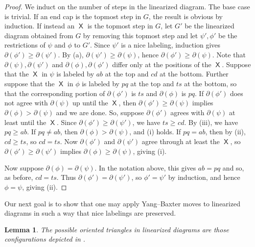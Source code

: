 \documentclass{amsart}
\newtheorem{lemma}[theorem]{Lemma}
\theoremstyle{definition}
\theoremstyle{remark}
\numberwithin{equation}{section}
\DeclareMathOperator{\tlex}{l\widetilde{ex}}
\DeclareMathOperator{\sfX}{\mathsf{X}}
\begin{document}
\begin{proof}
  We induct on the number of steps in the linearized diagram. The base case is trivial. If an end cap is the topmost step in $G$, the result is obvious by induction. If instead an $\sfX$ is the topmost step in $G$, let $G'$ be the linearized diagram obtained from $G$ by removing this topmost step and let $\psi', \phi'$ be the restrictions of $\psi$ and $\phi$ to $G'$. Since $\psi'$ is a nice labeling, induction gives $\partial(\phi') \geq_{\tlex} \partial(\psi')$. By (a), $\partial(\psi') \geq_{\tlex} \partial(\psi)$, hence $\partial(\phi') \geq_{\tlex} \partial(\psi)$. Note that $\partial(\psi), \partial(\psi')$ and $\partial(\phi), \partial(\phi')$ differ only at the positions of the $\sfX$. Suppose that the $\sfX$ in $\psi$ is labeled by $ab$ at the top and $cd$ at the bottom. Further suppose that the $\sfX$ in $\phi$ is labeled by $pq$ at the top and $ts$ at the bottom, so that the corresponding portion of $\partial(\phi')$ is $ts$ and $\partial(\phi)$ is $pq$. If $\partial(\phi')$ does not agree with $\partial(\psi)$ up until the $\sfX$, then $\partial(\phi') \geq_{\tlex} \partial(\psi)$ implies $\partial(\phi) >_{\tlex} \partial(\psi)$ and we are done. So, suppose $\partial(\phi')$ agrees with $\partial(\psi)$ at least until the $\sfX$. Since $\partial(\phi') \geq_{\tlex} \partial(\psi')$, we have $ts \geq_{\tlex} cd$. By (iii), we have $pq \geq_{\tlex} ab$. If $pq \neq ab$, then $\partial(\phi) >_{\tlex} \partial(\psi)$, and (i) holds. If $pq = ab$, then by (ii), $cd \geq_{\tlex} ts$, so $cd = ts$. Now $\partial(\phi')$ and $\partial(\psi')$ agree through at least the $\sfX$, so $\partial(\phi') \geq_{\tlex} \partial(\psi')$ implies $\partial(\phi) \geq_{\tlex} \partial(\psi)$, giving (i).

  Now suppose $\partial(\phi) = \partial(\psi)$. In the notation above, this gives $ab=pq$ and so, as before, $cd=ts$. Thus $\partial(\phi') = \partial(\psi')$, so $\phi' = \psi'$ by induction, and hence $\phi = \psi$, giving (ii).
\end{proof}

Our next goal is to show that one may apply Yang--Baxter moves to linearized diagrams in such a way that nice labelings are preserved.

\begin{lemma}\label{lem:linearized-benzene}
  The possible oriented triangles in linearized diagrams are those configurations depicted in .
\end{lemma}
\end{document}
